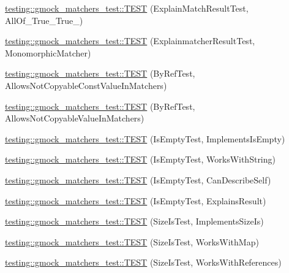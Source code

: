 \begin{DoxyCompactItemize}
\item 
\hyperlink{namespacetesting_1_1gmock__matchers__test_af1ba4010a24716a51a302f9a518023b5}{testing\+::gmock\+\_\+matchers\+\_\+test\+::\+T\+E\+ST} (Explain\+Match\+Result\+Test, All\+Of\+\_\+\+True\+\_\+\+True\+\_)
\item 
\hyperlink{namespacetesting_1_1gmock__matchers__test_a102b10d9064f6e0037e3f3f0c3e76e22}{testing\+::gmock\+\_\+matchers\+\_\+test\+::\+T\+E\+ST} (Explainmatcher\+Result\+Test, Monomorphic\+Matcher)
\item 
\hyperlink{namespacetesting_1_1gmock__matchers__test_aab82f120c70dc7d8bc2fd74ac6897486}{testing\+::gmock\+\_\+matchers\+\_\+test\+::\+T\+E\+ST} (By\+Ref\+Test, Allows\+Not\+Copyable\+Const\+Value\+In\+Matchers)
\item 
\hyperlink{namespacetesting_1_1gmock__matchers__test_a5ed7b822889a34f018c2ba8f21941fd4}{testing\+::gmock\+\_\+matchers\+\_\+test\+::\+T\+E\+ST} (By\+Ref\+Test, Allows\+Not\+Copyable\+Value\+In\+Matchers)
\item 
\hyperlink{namespacetesting_1_1gmock__matchers__test_ab63796f77c7572f6f1aef01cb140f99e}{testing\+::gmock\+\_\+matchers\+\_\+test\+::\+T\+E\+ST} (Is\+Empty\+Test, Implements\+Is\+Empty)
\item 
\hyperlink{namespacetesting_1_1gmock__matchers__test_a22f0cacccee169b7390741b9815f4281}{testing\+::gmock\+\_\+matchers\+\_\+test\+::\+T\+E\+ST} (Is\+Empty\+Test, Works\+With\+String)
\item 
\hyperlink{namespacetesting_1_1gmock__matchers__test_adcf3743190f973f2773296d0772e8950}{testing\+::gmock\+\_\+matchers\+\_\+test\+::\+T\+E\+ST} (Is\+Empty\+Test, Can\+Describe\+Self)
\item 
\hyperlink{namespacetesting_1_1gmock__matchers__test_a1c168c284000d05d63bf5e9df10d1b7c}{testing\+::gmock\+\_\+matchers\+\_\+test\+::\+T\+E\+ST} (Is\+Empty\+Test, Explains\+Result)
\item 
\hyperlink{namespacetesting_1_1gmock__matchers__test_abe619d5d1910e1f2e8b169622d1d8592}{testing\+::gmock\+\_\+matchers\+\_\+test\+::\+T\+E\+ST} (Size\+Is\+Test, Implements\+Size\+Is)
\item 
\hyperlink{namespacetesting_1_1gmock__matchers__test_aea77169d6c56b88b5c99273d5a2bc0f2}{testing\+::gmock\+\_\+matchers\+\_\+test\+::\+T\+E\+ST} (Size\+Is\+Test, Works\+With\+Map)
\item 
\hyperlink{namespacetesting_1_1gmock__matchers__test_a53bcd375786f69d889a8e8891ff8e0b0}{testing\+::gmock\+\_\+matchers\+\_\+test\+::\+T\+E\+ST} (Size\+Is\+Test, Works\+With\+References)

\end{DoxyCompactItemize}
